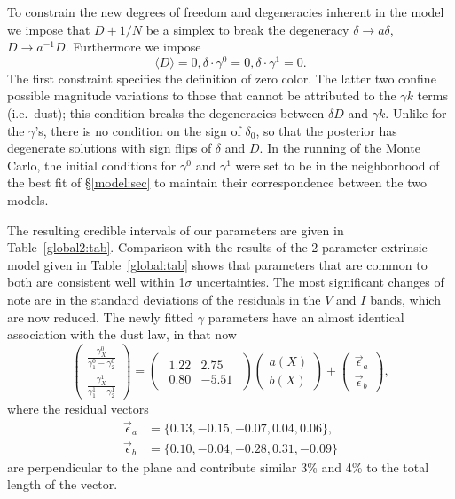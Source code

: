 \documentclass{aastex61}   	%
\begin{document}
To constrain the new degrees of freedom and degeneracies inherent in the model we impose that
$D+1/N$ be a simplex to break the 
degeneracy  $\delta \rightarrow a\delta$, $D \rightarrow a^{-1}D$.
Furthermore we impose
\begin{equation}
\langle D\rangle=0,  \delta \cdot \gamma^0=0, \delta \cdot \gamma^1=0.
\end{equation}
The first constraint specifies the definition of zero color.   The latter two confine possible magnitude
variations to those that cannot be attributed to 
the $\gamma k$ terms (i.e.\ dust); this condition breaks the degeneracies between $\delta D$  
and $\gamma k$. 
Unlike for the $\gamma$'s, there is no condition on the sign of $\delta_0$,
so that the posterior has degenerate solutions with sign flips of $\delta$ and $D$.
In the running of the Monte Carlo, the initial conditions for
$\gamma^0$ and $\gamma^1$ were set to be in the neighborhood of the best fit of \S\ref{model:sec}
to maintain their correspondence between the two models. 

The resulting credible intervals of our parameters are given in Table~\ref{global2:tab}.  Comparison with the
results of the 2-parameter extrinsic model given in Table~\ref{global:tab} shows that  parameters that are common to both
are consistent well within 1$\sigma$ uncertainties.  The most significant changes of note are in the standard
deviations of the residuals in the $V$ and $I$ bands, which are now reduced.
The newly fitted $\gamma$ parameters have an almost identical association with the   dust law, in that now
\begin{equation}
\begin{pmatrix}
 \frac{\gamma^0_X}{\gamma^0_1-\gamma^0_2} \\
\frac{\gamma^1_X}{\gamma^1_1-\gamma^1_2} 
\end{pmatrix}=
\begin{pmatrix}
\begin{array}{rr}
1.22 & 2.75 \\
0.80 & -5.51
\end{array}
\end{pmatrix} 
\begin{pmatrix}
a(X) \\
b(X)
\end{pmatrix}+
\begin{pmatrix}
\vec{\epsilon}_a \\
\vec{\epsilon}_b
\end{pmatrix},
\end{equation}
where the residual vectors 
\color{red}
\begin{align}
\vec{\epsilon}_a &=\{0.13, -0.15, -0.07,  0.04,  0.06\},\\
\vec{\epsilon}_b &=\{ 0.10, -0.04,  -0.28,  0.31, -0.09\}
\end{align}
\color{black}
are perpendicular to the   plane and
contribute similar 3\% and 4\% to the total  length of the vector.
\end{document}
